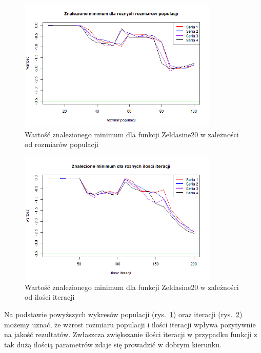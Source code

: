 \documentclass[11pt, a4paper]{article}
\newcommand{\fbi}{\leavevmode{\parindent=1em\indent}}
\begin{document}
\begin{figure}[H]
	\begin{center}
		\includegraphics[width=0.85\textwidth]{./assets/Zeldasine204.png}
		\caption{Wartość znalezionego minimum dla funkcji Zeldasine20 w zależności od rozmiarów populacji}
		\label{fig:zeldasine4}
	\end{center}
\end{figure}

\begin{figure}[H]
	\begin{center}
		\includegraphics[width=0.85\textwidth]{./assets/Zeldasine205.png}
		\caption{Wartość znalezionego minimum dla funkcji Zeldasine20 w zależności od ilości iteracji}
		\label{fig:zeldasine5}
	\end{center}
\end{figure}

\fbi
Na podstawie powyższych wykresów populacji (rys.~\ref{fig:zeldasine4}) oraz iteracji (rys.~\ref{fig:zeldasine5}) możemy uznać, że wzrost rozmiaru populacji i ilości iteracji wpływa pozytywnie na jakość rezultatów. Zwłaszcza zwiększanie ilości iteracji w przypadku funkcji z tak dużą ilością parametrów zdaje się prowadzić w dobrym kierunku.
\end{document}
